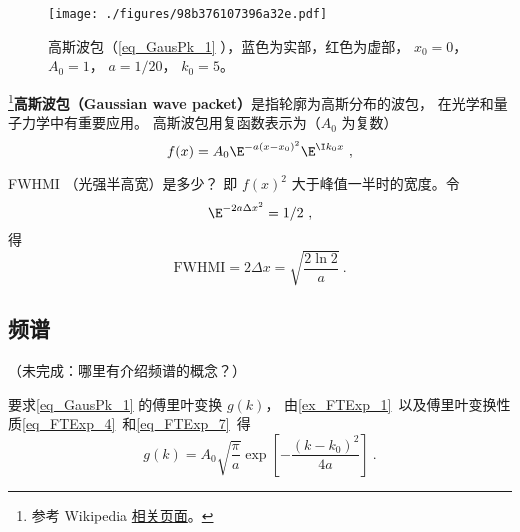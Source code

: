 
\begin{issues}
\issueDraft
\end{issues}


\begin{figure}[ht]
\centering
\texttt{[image: ./figures/98b376107396a32e.pdf]}
\caption{高斯波包（\autoref{eq_GausPk_1} ），蓝色为实部，红色为虚部， $x_0 = 0$， $A_0 = 1$， $a = 1/20$， $k_0 = 5$。} \label{fig_GausPk_1}
\end{figure}

\footnote{参考 Wikipedia \href{https://en.wikipedia.org/wiki/Wave_packet}{相关页面}。}\textbf{高斯波包（Gaussian wave packet）}是指轮廓为高斯分布的波包， 在光学和量子力学中有重要应用。 高斯波包用复函数表示为（$A_0$ 为复数）
\begin{equation}\label{eq_GausPk_1}
f(x) = A_0 \E^{-a(x-x_0)^2}\E^{\I k_0 x}~,
\end{equation}

FWHMI （光强半高宽）是多少？ 即 $f(x)^2$ 大于峰值一半时的宽度。令
\begin{equation}
\E^{-2a\Delta x^2} = 1/2~,
\end{equation}
得
\begin{equation}
\mathrm{FWHMI} = 2\Delta x = \sqrt{\frac{2\ln 2}{a}}~.
\end{equation}

\subsection{频谱}
（未完成：哪里有介绍频谱的概念？）

要求\autoref{eq_GausPk_1} 的傅里叶变换 $g(k)$， 由\autoref{ex_FTExp_1}~以及傅里叶变换性质\autoref{eq_FTExp_4}~和\autoref{eq_FTExp_7}~得
\begin{equation}
g(k) = A_0\sqrt{\frac{\pi}{a}} \exp[-\frac{(k-k_0)^2}{4a}]~.
\end{equation}
